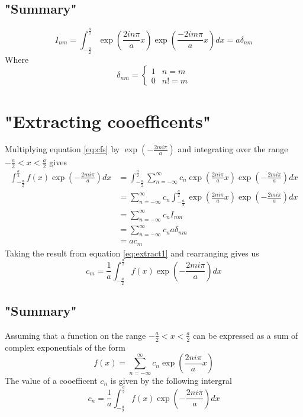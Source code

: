 \documentclass[11pt,twoside,a4paper]{article}
\begin{document}
\subsection{"Summary"}
\begin{mdframed}
\begin{equation*}
I_{nm} = \int_{-\frac{a}{2}}^{\frac{a}{2}} \exp \left( \frac{2 i n \pi}{a} x\right) \exp \left( \frac{-2 i m \pi}{a} x\right) dx = a \delta_{nm}
\end{equation*}
Where
\begin{equation*}
\delta_{nm} = \left\{
  \begin{array}{lr}
    1 & n = m\\
    0 & n != m
  \end{array}
\right.
\end{equation*}
\end{mdframed}
\section{"Extracting cooefficents"}
Multiplying equation \ref{eq:cfs} by $\exp\left(-\frac{2mi\pi}{a}\right)$ and
integrating over the range $-\frac{a}{2}<x<\frac{a}{2}$ gives
\begin{subequations}
  \label{eq:extract1}
\begin{align}
\label{eq:cfs2}
\int_{-\frac{a}{2}}^{\frac{a}{2}} f(x) \exp\left(-\frac{2mi\pi}{a}\right) dx &= \int_{-\frac{a}{2}}^{\frac{a}{2}} \sum_{n=-\infty}^{\infty} c_n \exp\left(\frac{2ni\pi}{a}x\right) \exp\left(-\frac{2mi\pi}{a}\right) dx \\
&=\sum_{n=-\infty}^{\infty} c_n \int_{-\frac{a}{2}}^{\frac{a}{2}} \exp\left(\frac{2ni\pi}{a}x\right) \exp\left(-\frac{2mi\pi}{a}\right) dx \\
&=\sum_{n=-\infty}^{\infty} c_n I_{nm} \\
&=\sum_{n=-\infty}^{\infty} c_n a \delta_{nm} \\
&= a c_m
\end{align}
\end{subequations}
Taking the result from equation \ref{eq:extract1} and rearranging gives us
\begin{equation}
c_m = \frac{1}{a}\int_{-\frac{a}{2}}^{\frac{a}{2}} f(x) \exp\left(-\frac{2mi\pi}{a}\right) dx
\end{equation}
\subsection{"Summary"}
\begin{mdframed}
Assuming that a function on the range $-\frac{a}{2}<x<\frac{a}{2}$ can be expressed
as a sum of complex exponentials of the form
\begin{equation*}
f(x)=\sum_{n=-\infty}^{\infty} c_n \exp\left(\frac{2ni\pi}{a}x\right)
\end{equation*}
The value of a cooefficent $c_n$ is given by the following intergral
\begin{equation*}
c_n = \frac{1}{a}\int_{-\frac{a}{2}}^{\frac{a}{2}} f(x) \exp\left(-\frac{2ni\pi}{a}\right) dx
\end{equation*}
\end{mdframed}
\end{document}

